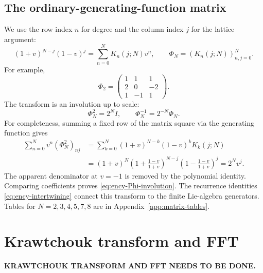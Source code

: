 \subsection{The ordinary-generating-function matrix}
\label{sec:matrix-Phi-definition}
We use the row index $n$ for degree and the column index $j$ for
the lattice argument:
\begin{equation}\label{eq:ency-Phi-generating}
(1+v)^{N-j}(1-v)^j
=\sum_{n=0}^N K_n(j;N)v^n,\qquad
\Phi_N=(K_n(j;N))_{n,j=0}^N.
\end{equation}
For example,
\[
\Phi_2=\begin{pmatrix}1&1&1\\2&0&-2\\1&-1&1\end{pmatrix}.
\]
The transform is an involution up to scale:
\begin{equation}\label{eq:ency-Phi-involution}
\Phi_N^2=2^NI,\qquad \Phi_N^{-1}=2^{-N}\Phi_N.
\end{equation}
For completeness, summing a fixed row of the matrix square via the
generating function gives
\begin{align*}
\sum_{n=0}^N v^n(\Phi_N^2)_{nj}
&=\sum_{k=0}^N(1+v)^{N-k}(1-v)^kK_k(j;N)\\
&=(1+v)^N\left(1+\frac{1-v}{1+v}\right)^{N-j}
\left(1-\frac{1-v}{1+v}\right)^j
=2^Nv^j.
\end{align*}
The apparent denominator at $v=-1$ is removed by the polynomial
identity. Comparing coefficients proves
\eqref{eq:ency-Phi-involution}.
The recurrence identities \eqref{eq:ency-intertwining} connect this
transform to the finite Lie-algebra generators. Tables for
$N=2,3,4,5,7,8$ are in Appendix~\ref{app:matrix-tables}.

\section{Krawtchouk transform and FFT}
\label{sec:14-4}

\noindent\textbf{KRAWTCHOUK TRANSFORM AND FFT NEEDS TO BE DONE.}



